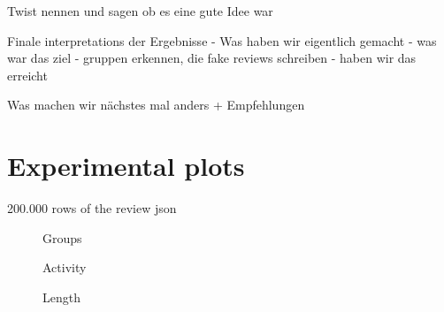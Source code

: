 \documentclass[conference]{IEEEtran}  %
\theoremstyle{plain}
\theoremstyle{definition}
\theoremstyle{remark}
\begin{document}
Twist nennen und sagen ob es eine gute Idee war

Finale interpretations der Ergebnisse 
 - Was haben wir eigentlich gemacht
 - was war das ziel
     - gruppen erkennen, die fake reviews schreiben
 - haben wir das erreicht


Was machen wir nächstes mal anders + Empfehlungen


\section{Experimental plots}
\label{sec:plots}

200.000 rows of the review json

\graphicspath{{plots/}}


\begin{figure}[H]
  \centering
  \hfill
  \caption{Groups}
\end{figure}


\begin{figure}[H]
  \centering
  \hfill
  \caption{Activity}
\end{figure}

\begin{figure}[H]
  \centering
  \hfill
  \caption{Length}
\end{figure}
\end{document}
